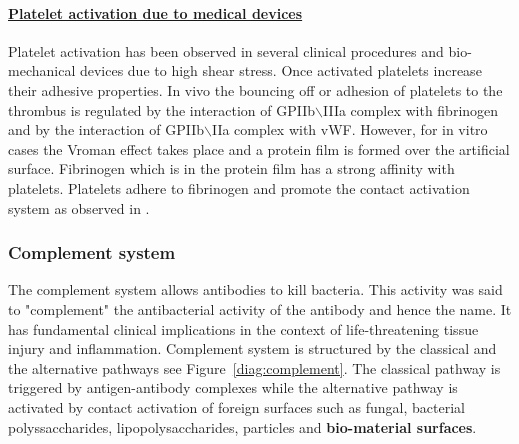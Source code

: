 \documentclass[%
 nofootinbib,
 amsmath,amssymb,
 aps,
 pra,
]{revtex4-1}
\begin{document}
\paragraph{\underline{Platelet activation due to medical devices}}
Platelet activation has been observed in several clinical procedures and bio-mechanical devices due to high shear stress. Once activated platelets increase their adhesive properties. In vivo the bouncing off or adhesion of platelets to the thrombus is regulated by the interaction of GPIIb$\backslash$IIIa complex with fibrinogen and by the interaction of GPIIb$\backslash$IIa complex with vWF. However, for in vitro cases the Vroman effect takes place and a protein film is formed over the artificial surface. Fibrinogen which is in the protein film has a strong affinity with platelets. Platelets adhere to fibrinogen and promote the contact activation system as observed in \cite{Renne:2005}. 
\subsubsection{Complement system}
The complement system allows antibodies to kill bacteria. This activity was said to "complement" the antibacterial activity of the antibody and hence the name. It has fundamental clinical implications in the context of life-threatening tissue injury and inflammation. Complement system is structured by the classical and the alternative pathways see Figure~\ref{diag:complement}. The classical pathway is triggered by antigen-antibody complexes while the alternative pathway is activated by contact activation of foreign surfaces such as fungal, bacterial polyssaccharides, lipopolysaccharides, particles and \textbf{bio-material surfaces}.\\
\end{document}
